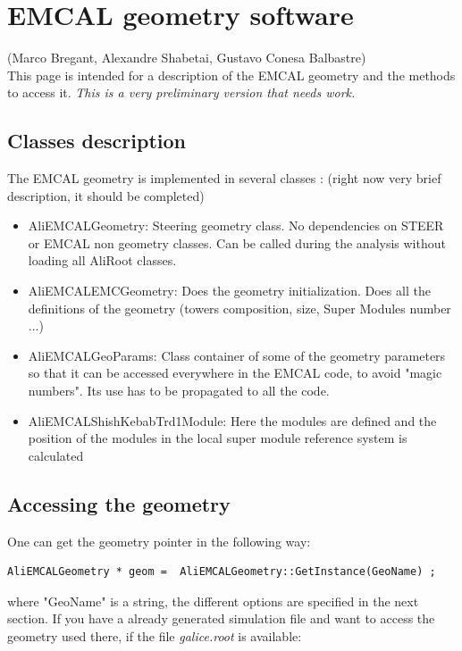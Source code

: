 \section{EMCAL geometry software}
(Marco Bregant, Alexandre Shabetai, Gustavo Conesa Balbastre)\\

This page is intended for a description of the EMCAL geometry and the methods to access it.  
{\it This is a very preliminary version that needs work.}

 \subsection {Classes description}

The EMCAL geometry is implemented in several classes : {\color{red} (right now very brief description, it should be completed) }
\begin{itemize}
\item AliEMCALGeometry: Steering geometry class.  No dependencies on STEER or EMCAL non geometry classes. Can be called during the analysis without loading all AliRoot classes.
\item AliEMCALEMCGeometry: Does the geometry initialization. Does all the definitions of the geometry (towers composition, size, Super Modules number ...)
\item AliEMCALGeoParams:  Class container of some of the geometry parameters so that it can be accessed everywhere in the EMCAL code, to avoid "magic numbers". Its use has to be propagated to all the code.
\item AliEMCALShishKebabTrd1Module: Here the modules are defined and the position of the modules in the local super module reference system is calculated
\end{itemize}

\subsection{Accessing the geometry}
One can get the geometry pointer in the following way:

\begin{lstlisting}
AliEMCALGeometry * geom =  AliEMCALGeometry::GetInstance(GeoName) ;
\end{lstlisting}

where "GeoName" is a string, the different options are specified in the next section. If you have a already generated simulation file and want to access the geometry used there, if the file {\it galice.root} is available:

